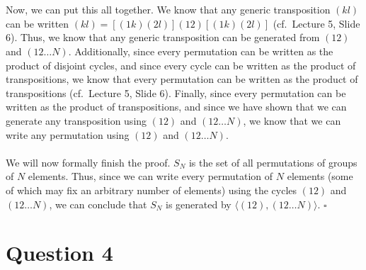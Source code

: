 \documentclass[letterpaper]{article}
\newcommand*{\QED}{\hfill\ensuremath{\square}}%
\begin{document}
\\ \\
Now, we can put this all together.
We know that any generic transposition $ (kl) $ can be written $ (kl) = [(1k)(2l)](12)[(1k)(2l)] $ (cf.\ Lecture 5, Slide 6).
Thus, we know that any generic transposition can be generated from $ (12) $ and $ (12 \ldots N) $.
Additionally, since every permutation can be written as the product of disjoint cycles, and since every cycle can be written as the product of transpositions, we know that every permutation can be written as the product of transpositions (cf.\ Lecture 5, Slide 6).
Finally, since every permutation can be written as the product of transpositions, and since we have shown that we can generate any transposition using $ (12) $ and $ (12 \ldots N) $, we know that we can write any permutation using $ (12) $ and $ (12 \ldots N) $.
\\ \\
We will now formally finish the proof.
$ S_N $ is the set of all permutations of groups of $ N $ elements.
Thus, since we can write every permutation of $ N $ elements (some of which may fix an arbitrary number of elements) using the cycles $ (12) $ and $ (12 \ldots N) $, we can conclude that $ S_N $ is generated by $ \langle (12), (12 \ldots N) \rangle $.
\QED{}

\section{Question 4}
\label{sec:Question4}
\end{document}
